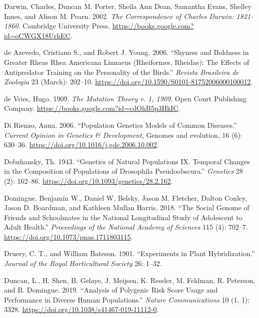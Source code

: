 \documentclass[
]{book}
\newlength{\cslhangindent}
\newlength{\cslentryspacingunit} %
\newenvironment{CSLReferences}[2] %
 {%
  \setlength{\parindent}{0pt}
  \ifodd #1
  \let\oldpar\par
  \def\par{\hangindent=\cslhangindent\oldpar}
  \fi
  \setlength{\parskip}{#2\cslentryspacingunit}
 }%
 {}
\begin{document}
\begin{CSLReferences}{1}{0}
\leavevmode{}%
Darwin, Charles, Duncan M. Porter, Sheila Ann Dean, Samantha Evans, Shelley Innes, and Alison M. Pearn. 2002. \emph{The {Correspondence} of {Charles Darwin}: 1821-1860}. {Cambridge University Press}. \url{https://books.google.com?id=oCWGX18UrhEC}.

\leavevmode{}%
de Azevedo, Cristiano S., and Robert J. Young. 2006. {``Shyness and Boldness in Greater Rheas {Rhea} Americana {Linnaeus} ({Rheiformes}, {Rheidae}): The Effects of Antipredator Training on the Personality of the Birds.''} \emph{Revista Brasileira de Zoologia} 23 (March): 202--10. \url{https://doi.org/10.1590/S0101-81752006000100012}.

\leavevmode{}%
de Vries, Hugo. 1909. \emph{The {Mutation} Theory v. 1, 1909}. {Open Court Publishing Company}. \url{https://books.google.com?id=cdOhB5p3HkIC}.

\leavevmode{}%
Di Rienzo, Anna. 2006. {``Population Genetics Models of Common Diseases.''} \emph{Current Opinion in Genetics \& Development}, Genomes and evolution, 16 (6): 630--36. \url{https://doi.org/10.1016/j.gde.2006.10.002}.

\leavevmode{}%
Dobzhansky, Th. 1943. {``Genetics of Natural Populations {IX}. {Temporal} Changes in the Composition of Populations of Drosophila Pseudoobscura.''} \emph{Genetics} 28 (2): 162--86. \url{https://doi.org/10.1093/genetics/28.2.162}.

\leavevmode{}%
Domingue, Benjamin W., Daniel W. Belsky, Jason M. Fletcher, Dalton Conley, Jason D. Boardman, and Kathleen Mullan Harris. 2018. {``The Social Genome of Friends and Schoolmates in the {National Longitudinal Study} of {Adolescent} to {Adult Health}.''} \emph{Proceedings of the National Academy of Sciences} 115 (4): 702--7. \url{https://doi.org/10.1073/pnas.1711803115}.

\leavevmode{}%
Druery, C. T., and William Bateson. 1901. {``Experiments in Plant Hybridization.''} \emph{Journal of the Royal Horticultural Society} 26: 1--32.

\leavevmode{}%
Duncan, L., H. Shen, B. Gelaye, J. Meijsen, K. Ressler, M. Feldman, R. Peterson, and B. Domingue. 2019. {``Analysis of Polygenic Risk Score Usage and Performance in Diverse Human Populations.''} \emph{Nature Communications} 10 (1, 1): 3328. \url{https://doi.org/10.1038/s41467-019-11112-0}.


\end{CSLReferences}
\end{document}
